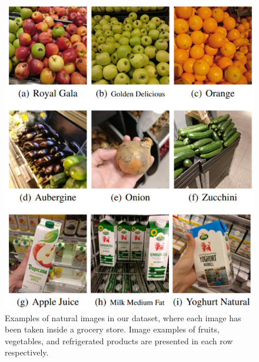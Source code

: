 

\begin{figure}[t] 
	\centering
	\begin{minipage}[b]{0.47\textwidth}
    	\includegraphics[scale=0.5]{PaperB/figures_and_tables/figure1.png}
		\caption{Examples of natural images in our dataset, where each image has been taken inside a grocery store. Image examples of fruits, vegetables, and refrigerated products are presented in each row respectively.}
		\label{fig:dataset_figures}
	\end{minipage}
	\hspace{10pt}
	\begin{minipage}[b]{0.47\textwidth}
		\centering

\end{minipage}
\end{figure}
